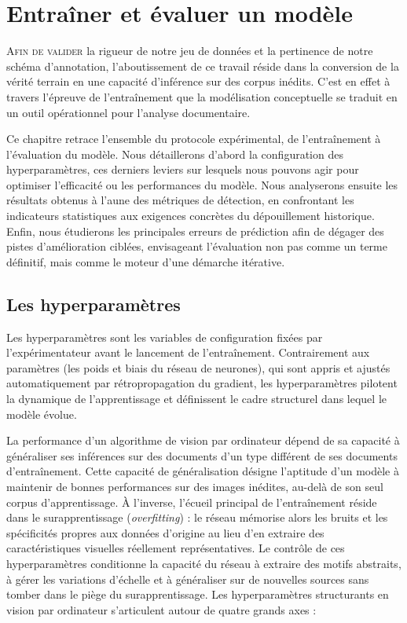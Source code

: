 \chapter[Entraîner et évaluer]{Entraîner et évaluer un modèle}

\lettrine{A}{fin de valider} la rigueur de notre jeu de données et la pertinence de notre schéma d'annotation, l'aboutissement de ce travail réside dans la conversion de la vérité terrain en une capacité d'inférence sur des corpus inédits. C'est en effet à travers l'épreuve de l'entraînement que la modélisation conceptuelle se traduit en un outil opérationnel pour l'analyse documentaire.

Ce chapitre retrace l'ensemble du protocole expérimental, de l'entraînement à l'évaluation du modèle. Nous détaillerons d'abord la configuration des hyperparamètres, ces derniers leviers sur lesquels nous pouvons agir pour optimiser l'efficacité ou les performances du modèle. Nous analyserons ensuite les résultats obtenus à l'aune des métriques de détection, en confrontant les indicateurs statistiques aux exigences concrètes du dépouillement historique. Enfin, nous étudierons les principales erreurs de prédiction afin de dégager des pistes d'amélioration ciblées, envisageant l'évaluation non pas comme un terme définitif, mais comme le moteur d'une démarche itérative.

\section{Les hyperparamètres}

Les hyperparamètres sont les variables de configuration fixées par l'expérimentateur avant le lancement de l'entraînement. Contrairement aux paramètres (les poids et biais du réseau de neurones), qui sont appris et ajustés automatiquement par rétropropagation du gradient, les hyperparamètres pilotent la dynamique de l'apprentissage et définissent le cadre structurel dans lequel le modèle évolue.

La performance d'un algorithme de vision par ordinateur dépend de sa capacité à généraliser ses inférences sur des documents d'un type différent de ses documents d'entraînement. Cette capacité de généralisation désigne l'aptitude d'un modèle à maintenir de bonnes performances sur des images inédites, au-delà de son seul corpus d'apprentissage. À l'inverse, l'écueil principal de l'entraînement réside dans le surapprentissage (\textit{overfitting}) : le réseau mémorise alors les bruits et les spécificités propres aux données d'origine au lieu d'en extraire des caractéristiques visuelles réellement représentatives. Le contrôle de ces hyperparamètres conditionne la capacité du réseau à extraire des motifs abstraits, à gérer les variations d'échelle et à généraliser sur de nouvelles sources sans tomber dans le piège du surapprentissage.
Les hyperparamètres structurants en vision par ordinateur s'articulent autour de quatre grands axes :

